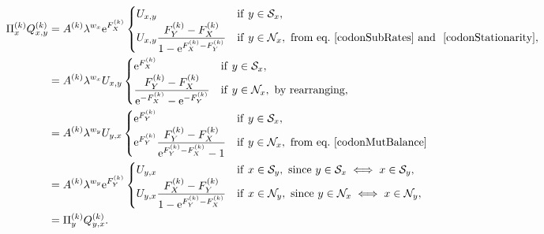 \begin{align}
\Pi_x^{(k)} Q_{x, y}^{(k)}
& =A^{(k)} \lambda^{w_x} \e^{F_X^{(k)}}
\begin{cases}
U_{x, y}
& \mathrm{if} \ y \in \NxSyn,  \\
U_{x, y} \dfrac{F_Y^{(k)} - F_X^{(k)}}{1 - \e^{F_X^{(k)} - F_Y^{(k)}}}
& \mathrm{if}  \ y \in \NxNonSyn, \ \textrm{from eq.}\ \ref{codonSubRates} \text{ and } \ \ref{codonStationarity},
\end{cases} \\
& =A^{(k)} \lambda^{w_x} U_{x, y}
\begin{cases}
\e^{F_X^{(k)}}
& \mathrm{if} \ y \in \NxSyn,  \\
\dfrac{F_Y^{(k)} - F_X^{(k)}}{ \e^{-F_X^{(k)}}  - \e^{- F_Y^{(k)}} }
& \mathrm{if}  \ y \in \NxNonSyn, \ \textrm{by rearranging},
\end{cases} \\
& =A^{(k)} \lambda^{w_y} U_{y, x}
\begin{cases}
\e^{F_Y^{(k)}}
& \mathrm{if} \ y \in \NxSyn , \\
\e^{F_Y^{(k)}} \dfrac{F_Y^{(k)} - F_X^{(k)}}{ \e^{F_Y^{(k)}-F_X^{(k)}} - 1 }
& \mathrm{if}  \ y \in \NxNonSyn, \ \textrm{from eq.} \ \ref{codonMutBalance}
\end{cases} \\
& =A^{(k)} \lambda^{w_y} \e^{F_Y^{(k)}}
\begin{cases}
U_{y, x}
& \mathrm{if} \ x \in \NySyn, \ \textrm{since} \ y \in \NxSyn \iff x \in \NySyn,  \\
U_{y, x} \dfrac{F_X^{(k)} - F_Y^{(k)}}{1 - \e^{F_Y^{(k)}-F_X^{(k)}}}
& \mathrm{if}  \ x \in \NyNonSyn, \ \textrm{since} \ y \in \NxNonSyn \iff x \in \NyNonSyn,
\end{cases} \\
& =\Pi_y^{(k)} Q_{y, x}^{(k)} .
\label{codonSubBalance}
\end{align}

